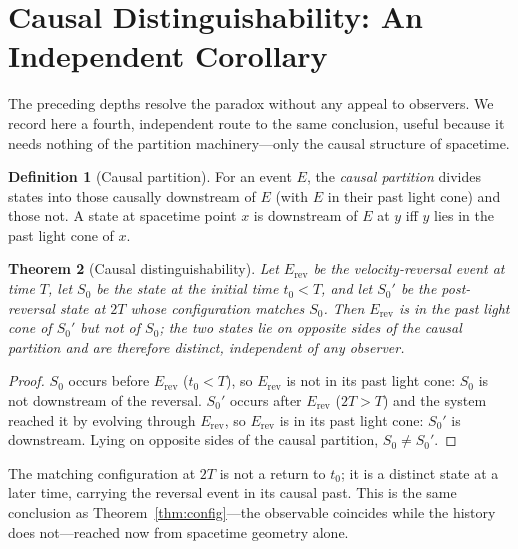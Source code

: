 \documentclass[11pt,a4paper]{article}
\theoremstyle{thmstyle}
\newtheorem{theorem}{Theorem}[section]
\theoremstyle{definition}
\newtheorem{definition}[theorem]{Definition}
\theoremstyle{remark}
\begin{document}
\section{Causal Distinguishability: An Independent Corollary}
\label{sec:causal}

The preceding depths resolve the paradox without any appeal to observers.
We record here a fourth, independent route to the same conclusion, useful
because it needs nothing of the partition machinery---only the causal
structure of spacetime.

\begin{definition}[Causal partition]
\label{def:causal}
For an event $E$, the \emph{causal partition} divides states into those
causally downstream of $E$ (with $E$ in their past light cone) and those
not. A state at spacetime point $x$ is downstream of $E$ at $y$ iff $y$
lies in the past light cone of $x$.
\end{definition}

\begin{theorem}[Causal distinguishability]
\label{thm:causal}
Let $E_{\mathrm{rev}}$ be the velocity-reversal event at time $T$, let
$S_{0}$ be the state at the initial time $t_{0}<T$, and let $S_{0}'$ be
the post-reversal state at $2T$ whose configuration matches $S_{0}$. Then
$E_{\mathrm{rev}}$ is in the past light cone of $S_{0}'$ but not of
$S_{0}$; the two states lie on opposite sides of the causal partition and
are therefore distinct, independent of any observer.
\end{theorem}

\begin{proof}
$S_{0}$ occurs before $E_{\mathrm{rev}}$ ($t_{0}<T$), so $E_{\mathrm{rev}}$
is not in its past light cone: $S_{0}$ is not downstream of the reversal.
$S_{0}'$ occurs after $E_{\mathrm{rev}}$ ($2T>T$) and the system reached
it by evolving through $E_{\mathrm{rev}}$, so $E_{\mathrm{rev}}$ is in its
past light cone: $S_{0}'$ is downstream. Lying on opposite sides of the
causal partition, $S_{0}\neq S_{0}'$.
\end{proof}

The matching configuration at $2T$ is not a return to $t_{0}$; it is a
distinct state at a later time, carrying the reversal event in its causal
past. This is the same conclusion as Theorem~\ref{thm:config}---the
observable coincides while the history does not---reached now from
spacetime geometry alone.
\end{document}
